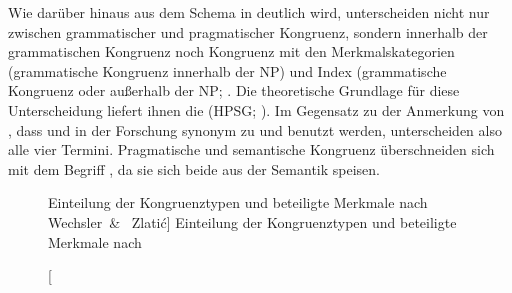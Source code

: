 Wie darüber hinaus aus dem Schema in  deutlich wird,
unterscheiden \citet{wechslerzlatic2003} nicht nur zwischen grammatischer und
pragmatischer Kongruenz, sondern innerhalb der grammatischen Kongruenz noch
Kongruenz mit den Merkmalskategorien  (grammatische Kongruenz
 innerhalb der NP) und Index (grammatische Kongruenz
 oder  außerhalb der NP;
\cite[8--17]{wechslerzlatic2003}. Die theoretische Grundlage für diese
Unterscheidung liefert ihnen die 
(HPSG; \cite{pollardsag1994}). Im Gegensatz zu der Anmerkung von
\citet[164]{fleischer2012}, dass  und  in der Forschung
synonym zu  und  benutzt werden, unterscheiden
\citet{wechslerzlatic2003} also alle vier Termini. Pragmatische und semantische
Kongruenz überschneiden sich mit dem Begriff , da sie
sich beide aus der Semantik speisen.

\begin{figure}
\centering
{}
\caption%
	[Einteilung der Kongruenztypen und beteiligte Merkmale nach Wechsler~\&~%
	Zlatić]%
	{Einteilung der Kongruenztypen und beteiligte Merkmale nach
	\citet{wechslerzlatic2003}}
\label{fig:termini}
\end{figure}

